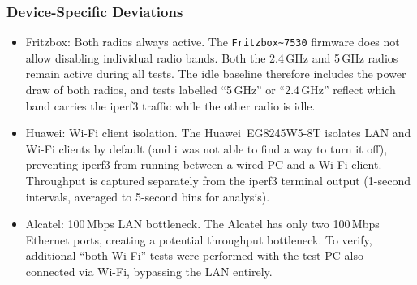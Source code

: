 \subsubsection{Device-Specific Deviations}

\begin{itemize}
    \item{Fritzbox: Both radios always active.}
The \verb|Fritzbox~7530| firmware does not allow disabling individual radio bands.
Both the 2.4\,GHz and 5\,GHz radios remain active during all tests.
The idle baseline therefore includes the power draw of both radios, and tests labelled ``5\,GHz'' or ``2.4\,GHz'' reflect which band carries the iperf3 traffic while the other radio is idle.
    \item{Huawei: Wi-Fi client isolation.}
The Huawei~EG8245W5-8T isolates \ac{LAN} and Wi-Fi clients by default (and i was not able to find a way to turn it off), preventing iperf3 from running between a wired PC and a Wi-Fi client. Throughput is captured separately from the iperf3 terminal output (1-second intervals, averaged to 5-second bins for analysis).
    \item{Alcatel: 100\,Mbps \ac{LAN} bottleneck.}
The Alcatel has only two 100\,Mbps Ethernet ports, creating a potential throughput bottleneck.
To verify, additional ``both Wi-Fi'' tests were performed with the test PC also connected via Wi-Fi, bypassing the \ac{LAN} entirely.
\end{itemize}

